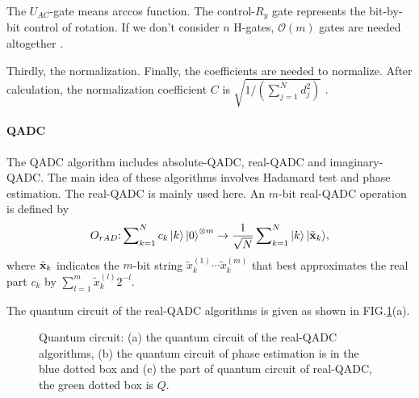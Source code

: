 \documentclass[%
 reprint,
 amsmath,amssymb,
pra,
]{revtex4-1}
\begin{document}
The ${U_{AC}}$-gate means arccos function. The control-${R_y}$ gate represents the bit-by-bit control of rotation. If we don't consider $n$ H-gates, $\mathcal{O}(m)$ gates are needed altogether \cite{mitarai2019quantum}.

Thirdly, the normalization. Finally, the coefficients are needed to normalize. After calculation, the normalization coefficient $C$ is $\sqrt {1/\left( {\sum\nolimits_{j = 1}^N {d_j^2} } \right)} $ \cite{mitarai2019quantum}.


\paragraph{QADC}

The QADC algorithm includes absolute-QADC, real-QADC and imaginary-QADC.
The main idea of these algorithms involves Hadamard test and phase estimation. The real-QADC is mainly used here. An $m$-bit real-QADC operation is defined by 
\begin{equation}
{O_{rAD}}{\rm{:}}\sum\nolimits_{k = 1}^N {{c_k}\left| k \right\rangle {{\left| 0 \right\rangle }^{ \otimes m}}}  \to \frac{1}{{\sqrt N }}\sum\nolimits_{k = 1}^N {\left| k \right\rangle \left| {{{\tilde{\textbf x} }_k}} \right\rangle } ,
\end{equation}
where ${\tilde {\textbf x}_k}$ indicates the $m$-bit string $\tilde x_k^{\left( 1 \right)} \cdots \tilde x_k^{\left( m \right)}$ that best approximates the real part ${c_k}$ by $\sum\nolimits_{l = 1}^m {\tilde x_k^{\left( l \right)}{2^{ - l}}} $.

The quantum circuit of the real-QADC algorithms is given as shown in FIG.\ref{QADC_fig}(a).

\begin{figure}[htbp]
 \caption{Quantum circuit: (a) the quantum circuit of the real-QADC algorithms, 
 (b) the quantum circuit of phase estimation is in the blue dotted box
 and (c) the part of quantum circuit of real-QADC, the green dotted box is $Q$.}
 \label{QADC_fig}
\end{figure}
\end{document}
